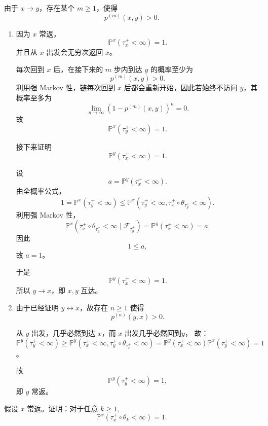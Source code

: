 \documentclass{ctexart}
\begin{document}
\begin{solution}

  由于 \(x\to y\)，存在某个 \(m\ge1\)，使得
  \[
    p^{(m)}(x,y)>0.
  \]

  \begin{enumerate}
    \item
      因为 \(x\) 常返，
      \[
        \mathbb P^x(\tau_x^+<\infty)=1.
      \]
      并且从 \(x\) 出发会无穷次返回 \(x\)。

      每次回到 \(x\) 后，在接下来的 \(m\) 步内到达 \(y\) 的概率至少为
      \[
        p^{(m)}(x,y)>0.
      \]
      利用强 Markov 性，链每次回到 \(x\) 后都会重新开始，因此若始终不访问 \(y\)，其概率至多为
      \[
        \lim_{n\to\infty}(1-p^{(m)}(x,y))^n=0.
      \]
      故
      \[
        \mathbb P^x(\tau_y^+<\infty)=1.
      \]

      接下来证明
      \[
        \mathbb P^y(\tau_x^+<\infty)=1.
      \]

      设
      \[
        a=\mathbb P^y(\tau_x^+<\infty).
      \]
      由全概率公式，
      \[
        1
        =
        \mathbb P^x(\tau_y^+<\infty)
        \le
        \mathbb P^x(\tau_y^+<\infty,\tau_x^+\circ\theta_{\tau_y^+}<\infty).
      \]
      利用强 Markov 性，
      \[
        \mathbb P^x(\tau_x^+\circ\theta_{\tau_y^+}<\infty
          \mid
        \mathscr F_{\tau_y^+})
        =
        \mathbb P^y(\tau_x^+<\infty)
        =a.
      \]
      因此
      \[
        1\le a,
      \]
      故 \(a=1\)。

      于是
      \[
        \mathbb P^y(\tau_x^+<\infty)=1.
      \]
      所以 \(y\to x\)，即 \(x,y\) 互达。
    \item
      由于已经证明 \(y\leftrightarrow x\)，故存在 \(n\ge1\) 使得
      \[
        p^{(n)}(y,x)>0.
      \]

      从 \(y\) 出发，几乎必然到达 \(x\)，而 \(x\) 出发几乎必然回到\(y \)，
      故：
      \[
        \mathbb{P}^y(\tau_y^+<\infty)\geq \mathbb{P}^y(\tau_x^+<\infty, \tau_y^+ \circ \theta_{\tau_x^+}<\infty ) = \mathbb{P}^y(\tau_x^+<\infty) \mathbb{P}^x(\tau_y^+<\infty) = 1
      \]。

      故
      \[
        \mathbb P^y(\tau_y^+<\infty)=1,
      \]
      即 \(y\) 常返。
  \end{enumerate}

\end{solution}

\begin{problem}
  假设 \(x\) 常返。证明：对于任意 \(k\ge1\),
  \[
    \mathbb P^x(\tau_x^+\circ\theta_k<\infty)=1.
  \]
\end{problem}
\end{document}
